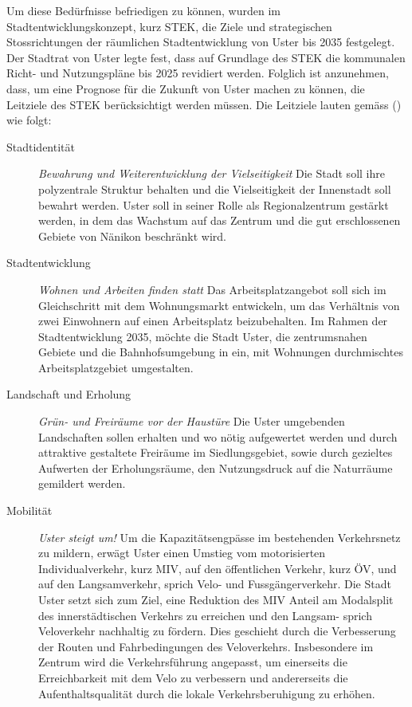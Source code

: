 Um diese Bedürfnisse befriedigen zu können, wurden im Stadtentwicklungskonzept, kurz STEK, die Ziele und strategischen Stossrichtungen der räumlichen Stadtentwicklung von Uster bis 2035 festgelegt. Der Stadtrat von Uster legte fest, dass auf Grundlage des STEK die kommunalen Richt- und Nutzungspläne bis 2025 revidiert werden. Folglich ist anzunehmen, dass, um eine Prognose für die Zukunft von Uster machen zu können, die Leitziele des STEK berücksichtigt werden müssen. Die Leitziele lauten gemäss (\cite{STEK}) wie folgt: 

\begin{description}
	\item[Stadtidentität]	\textit{Bewahrung und Weiterentwicklung der Vielseitigkeit} Die Stadt soll ihre polyzentrale Struktur behalten und die Vielseitigkeit der Innenstadt soll bewahrt werden. Uster soll in seiner Rolle als Regionalzentrum gestärkt werden, in dem das Wachstum auf das Zentrum und die gut erschlossenen Gebiete von Nänikon beschränkt wird.
\end{description}

\pagebreak

\begin{description}
	\item[Stadtentwicklung]	\textit{Wohnen und Arbeiten finden statt} Das Arbeitsplatzangebot soll sich im Gleichschritt mit dem Wohnungsmarkt entwickeln, um das Verhältnis von zwei Einwohnern auf einen Arbeitsplatz beizubehalten. Im Rahmen der Stadtentwicklung 2035, möchte die Stadt Uster, die zentrumsnahen Gebiete und die Bahnhofsumgebung in ein, mit Wohnungen durchmischtes Arbeitsplatzgebiet umgestalten. 
	\item[Landschaft und Erholung] \textit{Grün- und Freiräume vor der Haustüre} Die Uster umgebenden Landschaften sollen erhalten und wo nötig aufgewertet werden und durch attraktive gestaltete Freiräume im Siedlungsgebiet, sowie durch gezieltes Aufwerten der Erholungsräume, den Nutzungsdruck auf die Naturräume gemildert werden. 
	\item[Mobilität] \textit{Uster steigt um!} Um die Kapazitätsengpässe im bestehenden Verkehrsnetz zu mildern, erwägt Uster einen Umstieg vom motorisierten Individualverkehr, kurz MIV, auf den öffentlichen Verkehr, kurz ÖV, und auf den Langsamverkehr, sprich Velo- und Fussgängerverkehr. Die Stadt Uster setzt sich zum Ziel, eine Reduktion des MIV Anteil am Modalsplit des innerstädtischen Verkehrs zu erreichen und den Langsam- sprich Veloverkehr nachhaltig zu fördern. Dies geschieht durch die Verbesserung der Routen und Fahrbedingungen des Veloverkehrs. Insbesondere im Zentrum wird die Verkehrsführung angepasst, um einerseits die Erreichbarkeit mit dem Velo zu verbessern und andererseits die Aufenthaltsqualität durch die lokale Verkehrsberuhigung zu erhöhen.
\end{description}

